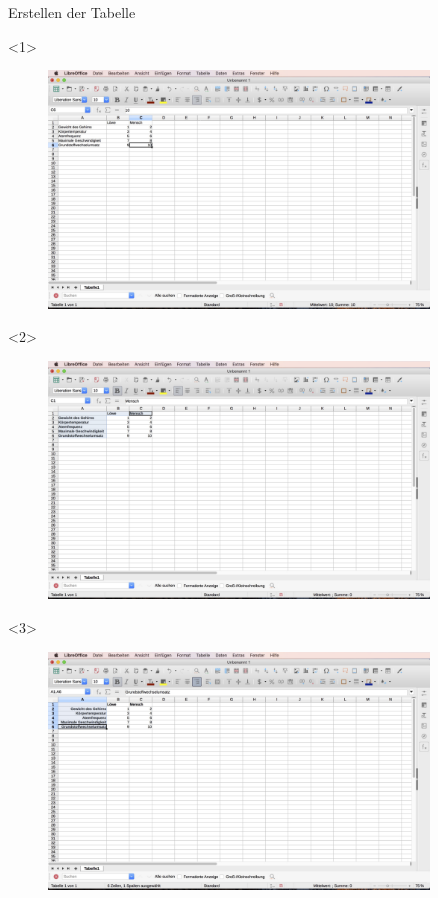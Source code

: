 \documentclass["WS\space 16-17\space -\space LaTeX-Kurs\space -\space Praesentation\space -\space 2.tex"]{subfiles}
\begin{document}
\begin{frame}[c]{Erstellen der Tabelle}
	\begin{onlyenv}
		\begin{figure}[htbp]
			\centering
			\includegraphics[width=0.9\textwidth]{img/Bildschirmfoto_mitKasten/3_Tabelle/1.jpg}
		\end{figure}
	\end{onlyenv}
	\begin{onlyenv}
		\begin{figure}[htbp]
			\centering
			\includegraphics[width=0.9\textwidth]{img/Bildschirmfoto_mitKasten/3_Tabelle/2.jpg}
		\end{figure}
	\end{onlyenv}
	\begin{onlyenv}
		\begin{figure}[htbp]
			\centering
			\includegraphics[width=0.9\textwidth]{img/Bildschirmfoto_mitKasten/3_Tabelle/3.jpg}

\end{figure}
\end{onlyenv}
\end{frame}
\end{document}
